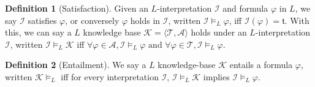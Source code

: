 \documentclass[letterpaper]{article} %
\theoremstyle{definition}
\theoremstyle{definition}
\newtheorem{definition}{Definition}
\theoremstyle{definition}
\theoremstyle{definition}
\theoremstyle{definition}
\newcommand{\vt}{\mathfrak{t}}
\begin{document}
\begin{definition}[Satisfaction]\label{def:ALC-Sat}
    Given an $L$-interpretation $\mathcal{I}$ and formula $\varphi$ in $L$, we say $\mathcal{I}$ satisfies $\varphi$, or conversely $\varphi$ holds in $\mathcal{I}$, written $\mathcal{I}\models_L\varphi$, iff $\mathcal{I}(\varphi) = \vt$. With this, we can say a $L$ knowledge base $\mathcal{K} = \langle \mathcal{T},\mathcal{A}\rangle$ holds under an $L$-interpretation $\mathcal{I}$, written $\mathcal{I}\models_L\mathcal{K}$ iff $\forall \varphi \in \mathcal{A}, \mathcal{I}\models_L\varphi \text{ and } \forall \varphi \in \mathcal{T}, \mathcal{I}\models_L\varphi$. 
\end{definition}

\noindent 
\begin{definition}[Entailment]\label{def:ALC-Ent}
We say a $L$ knowledge-base $\mathcal{K}$ entails a formula $\varphi$, written $\mathcal{K} \models_{L} $ iff for every interpretation $\mathcal{I}$, $\mathcal{I}\models_L\mathcal{K}$ implies $\mathcal{I}\models_L\varphi$.
\end{definition}
\end{document}

